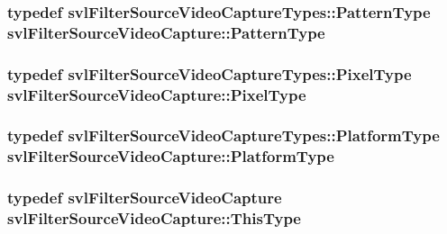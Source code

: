 \subsubsection[{Pattern\+Type}]{\setlength{\rightskip}{0pt plus 5cm}typedef svl\+Filter\+Source\+Video\+Capture\+Types\+::\+Pattern\+Type {\bf svl\+Filter\+Source\+Video\+Capture\+::\+Pattern\+Type}}\label{classsvl_filter_source_video_capture_a374a69b1d506cf982ba5ce45d5f84776}
\hypertarget{classsvl_filter_source_video_capture_a0d92a26e94ffd48535df5ab2ff330c90}{}
\subsubsection[{Pixel\+Type}]{\setlength{\rightskip}{0pt plus 5cm}typedef svl\+Filter\+Source\+Video\+Capture\+Types\+::\+Pixel\+Type {\bf svl\+Filter\+Source\+Video\+Capture\+::\+Pixel\+Type}}\label{classsvl_filter_source_video_capture_a0d92a26e94ffd48535df5ab2ff330c90}
\hypertarget{classsvl_filter_source_video_capture_a75f10dbd026c0ae70007a18758895ea0}{}
\subsubsection[{Platform\+Type}]{\setlength{\rightskip}{0pt plus 5cm}typedef svl\+Filter\+Source\+Video\+Capture\+Types\+::\+Platform\+Type {\bf svl\+Filter\+Source\+Video\+Capture\+::\+Platform\+Type}}\label{classsvl_filter_source_video_capture_a75f10dbd026c0ae70007a18758895ea0}
\hypertarget{classsvl_filter_source_video_capture_ad91d138b62c181697b084d06a12fb55a}{}
\subsubsection[{This\+Type}]{\setlength{\rightskip}{0pt plus 5cm}typedef {\bf svl\+Filter\+Source\+Video\+Capture} {\bf svl\+Filter\+Source\+Video\+Capture\+::\+This\+Type}}\label{classsvl_filter_source_video_capture_ad91d138b62c181697b084d06a12fb55a}


